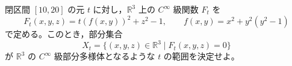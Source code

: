 \documentclass[12pt]{jlreq}
\newcommand{\R}{\mathbb{R}}
\begin{document}
閉区間 \([10,20]\) の元 \(t\) に対し，\(\R^3\) 上の \(C^\infty\) 級関数 \(F_t\) を
\[
  F_t(x,y,z)=t(f(x,y))^2+z^2-1,\qquad
  f(x,y)=x^2+y^2(y^2-1)
\]
で定める。このとき，部分集合
\[
  X_t=\{(x,y,z)\in\R^3\mid F_t(x,y,z)=0\}
\]
が \(\R^3\) の \(C^\infty\) 級部分多様体となるような \(t\) の範囲を決定せよ。
\end{document}
